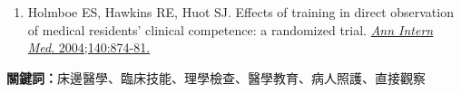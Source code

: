 \documentclass[11pt,a4paper]{article}
\begin{document}
\begin{enumerate}[leftmargin=*]
\item Holmboe ES, Hawkins RE, Huot SJ. Effects of training in direct observation of medical residents' clinical competence: a randomized trial. \href{https://doi.org/10.7326/0003-4819-140-11-200406010-00008}{\textit{Ann Intern Med}. 2004;140:874-81.}


\end{enumerate}

\vspace{1cm}
\textbf{關鍵詞：}床邊醫學、臨床技能、理學檢查、醫學教育、病人照護、直接觀察
\end{document}
